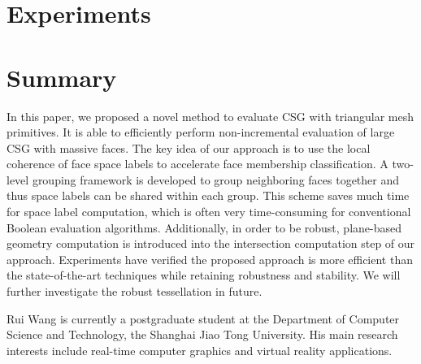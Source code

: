 \documentclass[10pt,journal,compsoc]{IEEEtran}
\begin{document}

\section{Experiments}

\section{Summary}

In this paper, we proposed a novel method to evaluate CSG with triangular mesh primitives. It is able to efficiently perform non-incremental evaluation of large CSG with massive faces. The key idea of our approach is to use the local coherence of face space labels to accelerate face membership classification. A two-level grouping framework is developed to group neighboring faces together and thus space labels can be shared within each group. This scheme saves much time for space label computation, which is often very time-consuming for conventional Boolean evaluation algorithms. Additionally, in order to be robust, plane-based geometry computation is introduced into the intersection computation step of our approach. Experiments have verified the proposed approach is more efficient than the state-of-the-art techniques while retaining robustness and stability. We will further investigate the robust tessellation in future.



\appendices







\begin{IEEEbiography}{Rui Wang}
is currently a postgraduate student at the Department of Computer Science and Technology, the Shanghai Jiao Tong University. His main research interests include real-time computer graphics and virtual reality applications.
\end{IEEEbiography}
\end{document}
